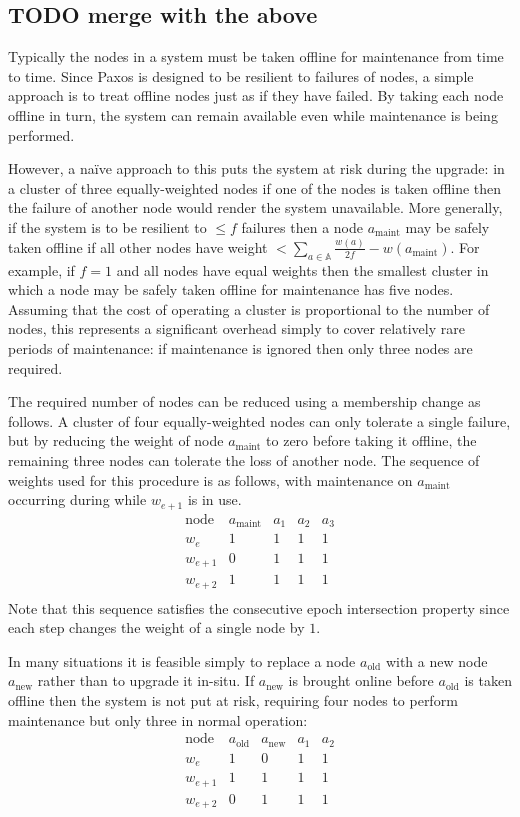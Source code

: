 \documentclass[journal]{IEEEtran}
\begin{document}
\subsection{TODO merge with the above}

Typically the nodes in a system must be taken offline for maintenance from time
to time. Since Paxos is designed to be resilient to failures of nodes, a simple
approach is to treat offline nodes just as if they have failed. By taking each
node offline in turn, the system can remain available even while maintenance is
being performed.

However, a na\"ive approach to this puts the system at risk during the upgrade:
in a cluster of three equally-weighted nodes if one of the nodes is taken
offline then the failure of another node would render the system unavailable.
More generally, if the system is to be resilient to $\le f$ failures then a
node $a_{\textrm{maint}}$ may be safely taken offline if all other nodes have
weight $< \sum_{a \in \mathbb A} \frac{w(a)}{2f} - w(a_{\textrm{maint}})$. For
example, if $f = 1$ and all nodes have equal weights then the smallest cluster
in which a node may be safely taken offline for maintenance has five nodes.
Assuming that the cost of operating a cluster is proportional to the number of
nodes, this represents a significant overhead simply to cover relatively rare
periods of maintenance: if maintenance is ignored then only three nodes are
required.

The required number of nodes can be reduced using a membership change as
follows. A cluster of four equally-weighted nodes can only tolerate a single
failure, but by reducing the weight of node $a_{\textrm{maint}}$ to zero before
taking it offline, the remaining three nodes can tolerate the loss of another
node. The sequence of weights used for this procedure is as follows, with
maintenance on $a_{\textrm{maint}}$ occurring during while $w_{e+1}$ is in use.
\[\begin{array}{rcccc}
\textrm{node}&a_{\textrm{maint}}&a_1&a_2&a_3 \\
w_e&1&1&1&1\\
w_{e+1}&0&1&1&1\\
w_{e+2}&1&1&1&1\\
\end{array}\]
Note that this sequence satisfies the consecutive epoch intersection property
since each step changes the weight of a single node by $1$.

In many situations it is feasible simply to replace a node $a_{\textrm{old}}$
with a new node $a_{\textrm{new}}$ rather than to upgrade it in-situ. If
$a_{\textrm{new}}$ is brought online before $a_{\textrm{old}}$ is taken offline
then the system is not put at risk, requiring four nodes to perform maintenance
but only three in normal operation:
\[\begin{array}{rcccc}
\textrm{node}&a_{\textrm{old}}&a_{\textrm{new}}&a_1&a_2 \\
w_e&1&0&1&1\\
w_{e+1}&1&1&1&1\\
w_{e+2}&0&1&1&1\\
\end{array}\]
\end{document}
